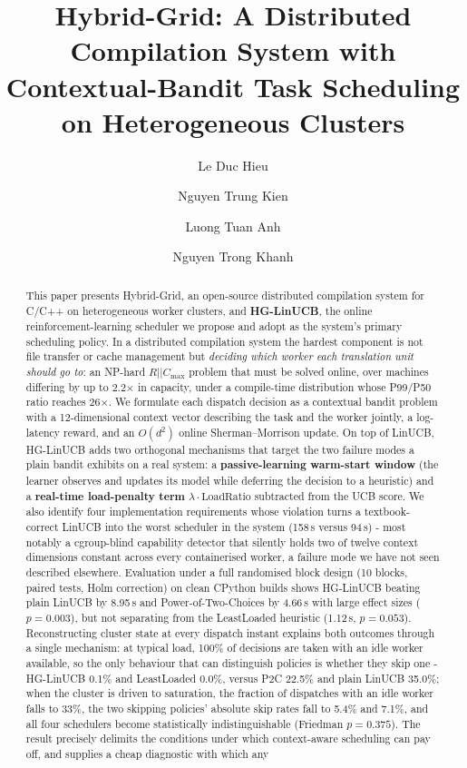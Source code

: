 \documentclass[final,5p,times,twocolumn]{elsarticle}
\begin{document}
\begin{frontmatter}

\title{Hybrid-Grid: A Distributed Compilation System with Contextual-Bandit Task Scheduling on Heterogeneous Clusters}

\author[a]{Le Duc Hieu}
\author[a]{Nguyen Trung Kien}
\author[a]{Luong Tuan Anh}
\author[a]{Nguyen Trong Khanh}

\begin{abstract}
This paper presents Hybrid-Grid, an open-source distributed compilation system for C/C++ on heterogeneous worker clusters, and \textbf{HG-LinUCB}, the online reinforcement-learning scheduler we propose and adopt as the system's primary scheduling policy. In a distributed compilation system the hardest component is not file transfer or cache management but \emph{deciding which worker each translation unit should go to}: an NP-hard $R||C_{\max}$ problem that must be solved online, over machines differing by up to 2.2$\times$ in capacity, under a compile-time distribution whose P99/P50 ratio reaches 26$\times$. We formulate each dispatch decision as a contextual bandit problem with a 12-dimensional context vector describing the task and the worker jointly, a log-latency reward, and an $O(d^2)$ online Sherman--Morrison update. On top of LinUCB, HG-LinUCB adds two orthogonal mechanisms that target the two failure modes a plain bandit exhibits on a real system: a \textbf{passive-learning warm-start window} (the learner observes and updates its model while deferring the decision to a heuristic) and a \textbf{real-time load-penalty term} $\lambda\cdot\text{LoadRatio}$ subtracted from the UCB score. We also identify four implementation requirements whose violation turns a textbook-correct LinUCB into the worst scheduler in the system (158\,s versus 94\,s) - most notably a cgroup-blind capability detector that silently holds two of twelve context dimensions constant across every containerised worker, a failure mode we have not seen described elsewhere. Evaluation under a full randomised block design (10 blocks, paired tests, Holm correction) on clean CPython builds shows HG-LinUCB beating plain LinUCB by 8.95\,s and Power-of-Two-Choices by 4.66\,s with large effect sizes ($p=0.003$), but not separating from the LeastLoaded heuristic (1.12\,s, $p=0.053$). Reconstructing cluster state at every dispatch instant explains both outcomes through a single mechanism: at typical load, 100\% of decisions are taken with an idle worker available, so the only behaviour that can distinguish policies is whether they skip one - HG-LinUCB 0.1\% and LeastLoaded 0.0\%, versus P2C 22.5\% and plain LinUCB 35.0\%; when the cluster is driven to saturation, the fraction of dispatches with an idle worker falls to 33\%, the two skipping policies' absolute skip rates fall to 5.4\% and 7.1\%, and all four schedulers become statistically indistinguishable (Friedman $p=0.375$). The result precisely delimits the conditions under which context-aware scheduling can pay off, and supplies a cheap diagnostic with which any 
\end{abstract}
\end{frontmatter}
\end{document}
